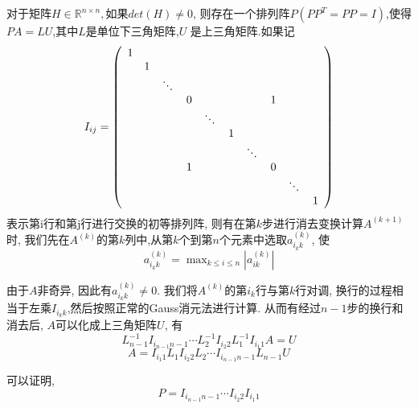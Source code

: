 \documentclass[a4paper]{article}
\begin{document}
\begin{CJK*}{GBK}{song}
对于矩阵$H\in \mathbb{R}^{n\times n}, \text{如果}det(H)\neq 0$, 则存在一个排列阵$P(PP^T=PP=I)$,使得$PA=LU$,其中$L$是单位下三角矩阵,$U$ 是上三角矩阵.如果记
$$I_{ij}= \left(                 %
            \begin{array}{cccccccccc}   %
            1& & & & & & & & &  \\  %
             & 1& & & & & & & & \\  %
             & &\rotatebox{-45}{$\cdots$}& & & &  & & &\\
             & & & 0 & & & & 1 & &   \\
             & & & & \rotatebox{-45}{$\cdots$} & & &  & & \\
             & & & & & 1 & & &  & \\  %
             & & & & & &\rotatebox{-45}{$\cdots$} & &  &\\
             & & & 1 & & & & 0 & &   \\
             & & & & & & & & \rotatebox{-45}{$\cdots$}&   \\
             & & & & & & & & & 1\\
            \end{array}
            \right)                 %
$$
表示第i行和第j行进行交换的初等排列阵, 则有在第$k$步进行消去变换计算$A^{(k+1)}$时, 我们先在$A^{(k)}$的第$k$列中,从第$k$个到第$n$个元素中选取$a_{i_kk}^{(k)}$, 使
$$ a_{i_kk}^{(k)}= \mathop{\text{max}}_{k\leq i \leq n}|a_{ik}^{(k)}| $$

由于$A$非奇异, 因此有$a_{i_kk}^{(k)}\neq 0$. 我们将$A^{(k)}$的第$i_k$行与第$k$行对调, 换行的过程相当于左乘$I_{i_kk}$,然后按照正常的Gauss消元法进行计算. 从而有经过$n-1$步的换行和消去后, $A$可以化成上三角矩阵$U$, 有
$$L_{n-1}^{-1}I_{i_{n-1}n-1}\cdots L_{2}^{-1}I_{i_{2}2}L_{1}^{-1}I_{i_{1}1}A=U$$
$$A=I_{i_{1}1}L_{1} I_{i_{2}2}L_{2} \cdots I_{i_{n-1}n-1}L_{n-1}U$$

可以证明,
$$P= I_{i_{n-1}n-1}\cdots I_{i_{2}2} I_{i_{1}1}$$


\end{CJK*}
\end{document}
